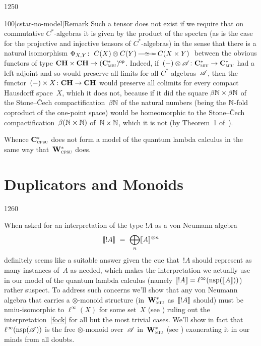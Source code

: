 \begin{parsec}{1250}
\begin{point}{100}[cstar-no-model]{Remark}
Such a tensor does not exist
if we require that
on commutative
$C^*$-algebras it is given by the product of the spectra
(as is the case for the projective and injective tensors
of $C^*$-algebras)
in the sense that there
is a natural isomorphism
$\Phi_{X,Y}\colon 
\smash{\xymatrix{
C(X)\otimes C(Y)
\ar[r]|-{\cong}
&
C(X\times  Y)}}$ 
between the obvious functors of type $\mathbf{CH}\times \mathbf{CH}\to {(\mathbf{C}^*_{\text{\textsc{miu}}})}{^{\mathsf{op}}}$.
Indeed, if~$(-)\otimes \mathscr{A}\colon \mathbf{C}^*_{\text{\textsc{miu}}}\to\mathbf{C}^*_{\text{\textsc{miu}}}$
had a left adjoint 
and so would preserve all limits
for all $C^*$-algebras~$\mathscr{A}$,
then the functor~$(-)\times X\colon \mathbf{CH}\to\mathbf{CH}$
would preserve all colimits
for every compact Hausdorff space~$X$,
which it does not,
because if it did
the square $\beta\mathbb{N} \times \beta\mathbb{N}$ of
the Stone--\v{C}ech compactification~$\beta\mathbb{N}$
of the natural numbers (being the $\mathbb{N}$-fold
coproduct of the one-point space)
would be homeomorphic to the Stone--\v{C}ech
compactification~$\beta(\mathbb{N}\times \mathbb{N})$
of~$\mathbb{N}\times \mathbb{N}$,
which it is not (by Theorem~1 of~\cite{glicksberg1959}).

Whence
$\mathbf{C}^*_{\text{\textsc{cpsu}}}$
does not form a model of the quantum lambda calculus
in the same way that~$\mathbf{W}^*_{\text{\textsc{cpsu}}}$ does.
\end{point}
\end{parsec}

\section{Duplicators and Monoids}
\label{S:duplicable}
\begin{parsec}{1260}%
\begin{point}{10}%
When asked for an
interpretation of the type $!A$
as a von Neumann algebra
\begin{equation}
\label{fock}
\sem{!A}
\ = \ 
\bigoplus_n \sem{A}^{\otimes n}
\end{equation}
definitely seems
like a suitable answer
given
the cue that~$!A$ should represent
as many instances of~$A$ as needed,
which makes the interpretation
we actually use in our model of the quantum lambda calculus
(namely $\llbracket!A\rrbracket=\ell^\infty(\mathrm{nsp}(\llbracket A\rrbracket))$)
rather
suspect.
To address such concerns
we'll show that any von Neumann algebra
that carries a $\otimes$-monoid structure
(in~$\mathbf{W}^*_{\text{\textsc{miu}}}$ as~$\llbracket!A\rrbracket$ should)
must be nmiu-isomorphic
to $\ell^\infty(X)$ for some set~$X$
(see )
ruling out the interpretation~\eqref{fock}
for all but the most trivial cases.
We'll show in fact that~$\ell^\infty(\mathrm{nsp}(\mathscr{A}))$
is the free $\otimes$-monoid
over~$\mathscr{A}$
in~$\mathbf{W}^*_{\text{\textsc{miu}}}$ (see )
exonerating it in our minds from all doubts.
\end{point}
\end{parsec}
